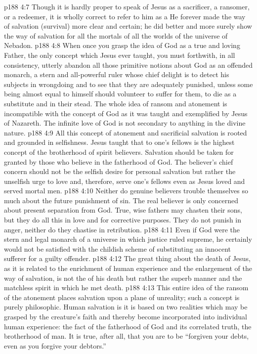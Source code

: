 \vs p188 4:7 Though it is hardly proper to speak of Jesus as a sacrificer, a ransomer, or a redeemer, it is wholly correct to refer to him as a  He forever made the way of salvation (survival) more clear and certain; he did better and more surely show the way of salvation for all the mortals of all the worlds of the universe of Nebadon.
\vs p188 4:8 When once you grasp the idea of God as a true and loving Father, the only concept which Jesus ever taught, you must forthwith, in all consistency, utterly abandon all those primitive notions about God as an offended monarch, a stern and all\hyp{}powerful ruler whose chief delight is to detect his subjects in wrongdoing and to see that they are adequately punished, unless some being almost equal to himself should volunteer to suffer for them, to die as a substitute and in their stead. The whole idea of ransom and atonement is incompatible with the concept of God as it was taught and exemplified by Jesus of Nazareth. The infinite love of God is not secondary to anything in the divine nature.
\vs p188 4:9 All this concept of atonement and sacrificial salvation is rooted and grounded in selfishness. Jesus taught that  to one’s fellows is the highest concept of the brotherhood of spirit believers. Salvation should be taken for granted by those who believe in the fatherhood of God. The believer’s chief concern should not be the selfish desire for personal salvation but rather the unselfish urge to love and, therefore, serve one’s fellows even as Jesus loved and served mortal men.
\vs p188 4:10 Neither do genuine believers trouble themselves so much about the future punishment of sin. The real believer is only concerned about present separation from God. True, wise fathers may chasten their sons, but they do all this in love and for corrective purposes. They do not punish in anger, neither do they chastise in retribution.
\vs p188 4:11 Even if God were the stern and legal monarch of a universe in which justice ruled supreme, he certainly would not be satisfied with the childish scheme of substituting an innocent sufferer for a guilty offender.
\vs p188 4:12 The great thing about the death of Jesus, as it is related to the enrichment of human experience and the enlargement of the way of salvation, is not the  of his death but rather the superb manner and the matchless spirit in which he met death.
\vs p188 4:13 This entire idea of the ransom of the atonement places salvation upon a plane of unreality; such a concept is purely philosophic. Human salvation is  it is based on two realities which may be grasped by the creature’s faith and thereby become incorporated into individual human experience: the fact of the fatherhood of God and its correlated truth, the brotherhood of man. It is true, after all, that you are to be \textcolor{ubdarkred}{“forgiven your debts, even as you forgive your debtors.”}\plusone
